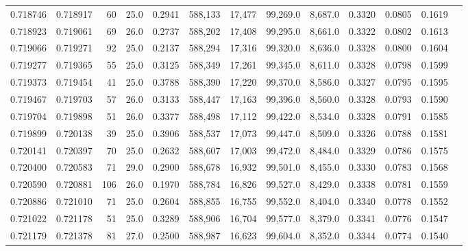 \begin{tabular}{rrrrrrrrrrrrr}
0.718746 & 0.718917 &    60 & 25.0 &                                     0.2941 & 588,133 &  17,477 &  99,269.0 &   8,687.0 & 0.3320 & 0.0805 & 0.1619 \\
0.718923 & 0.719061 &    69 & 26.0 &                                     0.2737 & 588,202 &  17,408 &  99,295.0 &   8,661.0 & 0.3322 & 0.0802 & 0.1613 \\
0.719066 & 0.719271 &    92 & 25.0 &                                     0.2137 & 588,294 &  17,316 &  99,320.0 &   8,636.0 & 0.3328 & 0.0800 & 0.1604 \\
0.719277 & 0.719365 &    55 & 25.0 &                                     0.3125 & 588,349 &  17,261 &  99,345.0 &   8,611.0 & 0.3328 & 0.0798 & 0.1599 \\
0.719373 & 0.719454 &    41 & 25.0 &                                     0.3788 & 588,390 &  17,220 &  99,370.0 &   8,586.0 & 0.3327 & 0.0795 & 0.1595 \\
0.719467 & 0.719703 &    57 & 26.0 &                                     0.3133 & 588,447 &  17,163 &  99,396.0 &   8,560.0 & 0.3328 & 0.0793 & 0.1590 \\
0.719704 & 0.719898 &    51 & 26.0 &                                     0.3377 & 588,498 &  17,112 &  99,422.0 &   8,534.0 & 0.3328 & 0.0791 & 0.1585 \\
0.719899 & 0.720138 &    39 & 25.0 &                                     0.3906 & 588,537 &  17,073 &  99,447.0 &   8,509.0 & 0.3326 & 0.0788 & 0.1581 \\
0.720141 & 0.720397 &    70 & 25.0 &                                     0.2632 & 588,607 &  17,003 &  99,472.0 &   8,484.0 & 0.3329 & 0.0786 & 0.1575 \\
0.720400 & 0.720583 &    71 & 29.0 &                                     0.2900 & 588,678 &  16,932 &  99,501.0 &   8,455.0 & 0.3330 & 0.0783 & 0.1568 \\
0.720590 & 0.720881 &   106 & 26.0 &                                     0.1970 & 588,784 &  16,826 &  99,527.0 &   8,429.0 & 0.3338 & 0.0781 & 0.1559 \\
0.720886 & 0.721010 &    71 & 25.0 &                                     0.2604 & 588,855 &  16,755 &  99,552.0 &   8,404.0 & 0.3340 & 0.0778 & 0.1552 \\
0.721022 & 0.721178 &    51 & 25.0 &                                     0.3289 & 588,906 &  16,704 &  99,577.0 &   8,379.0 & 0.3341 & 0.0776 & 0.1547 \\
0.721179 & 0.721378 &    81 & 27.0 &                                     0.2500 & 588,987 &  16,623 &  99,604.0 &   8,352.0 & 0.3344 & 0.0774 & 0.1540 \\

\end{tabular}
